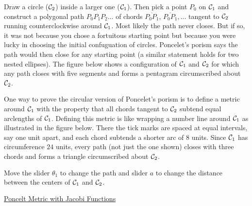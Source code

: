 \documentclass{ximera}
\begin{document}

Draw a circle (${\cal C}_2$) inside a larger one (${\cal C}_1$). Then pick a point $P_0$ on ${\cal C}_1$ and construct a polygonal path $P_0 P_1 P_2 \ldots$ of chords $\overline{P_0P_1}$, $\overline{P_0P_1}, \ldots$ tangent to ${\cal C}_2$ running counterclockwise around ${\cal C}_1$. Most likely the path never closes.  But if so, it was not because you chose a fortuitous starting point but because you were lucky in choosing the initial confuguation of circles. Poncelet's porism says the path would then close for any starting point (a similar statement holds for two nested ellipses). The figure below shows a configuration of ${\cal C}_1$ and ${\cal C}_2$ for which any path closes with five segments and forms a pentagram circumscribed about ${\cal C}_2$.


One way to prove the circular version of Poncelet's porism is to define a metric around ${\cal C}_1$ with the property that all chords tangent to ${\cal C}_2$ subtend equal arclengths of ${\cal C}_1$. Defining this metric is like wrapping a number line around ${\cal C}_1$ as illustrated in the figure below. There the tick marks are spaced at equal intervals, say one unit apart, and each chord subtends a shorter arc of $8$ units. Since ${\cal C}_1$ has circumference $24$ units, every path (not just the one shown) closes with three chords and forms a triangle circumscribed about ${\cal C}_2$.  

\begin{exploration}
Move the slider $\theta_1$ to change the path and slider $a$ to change the distance between the centers of ${\cal C}_1$ and ${\cal C}_2$.
 
\begin{onlineOnly}
    \begin{center}
\end{center}
\end{onlineOnly}

\href{https://www.desmos.com/calculator/wzctareiln}{Poncelt Metric with Jacobi Functions}

\end{exploration}
\end{document}
